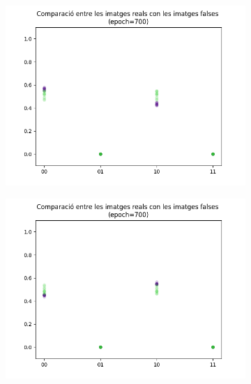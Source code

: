 \begin{figure}
	\begin{subfigure}[b]{.32\linewidth}
		\includegraphics[width=\linewidth]{figures/data/scatter_plot_4.png}
		\caption{}
	\end{subfigure}
	\begin{subfigure}[b]{.32\linewidth}
		\includegraphics[width=\linewidth]{figures/data/scatter_plot_5.png}
		\caption{}
	\end{subfigure}
	\begin{subfigure}[b]{.32\linewidth}

\end{subfigure}
\end{figure}
